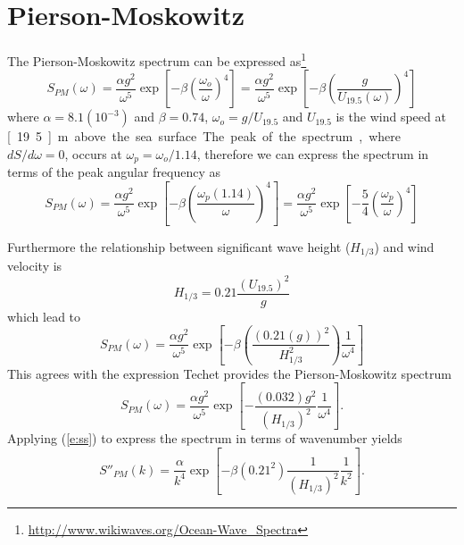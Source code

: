 \documentclass[11pt]{article}
\begin{document}
\section{Pierson-Moskowitz}
The Pierson-Moskowitz spectrum can be expressed as\footnote{\url{http://www.wikiwaves.org/Ocean-Wave_Spectra}}
\begin{equation}
S_{PM}(\omega)=\frac{\alpha g^2}{\omega^5} \exp{\left[ -\beta \left(\frac{\omega_o}{\omega}\right)^4 \right]} =\frac{\alpha g^2}{\omega^5} \exp{\left[ -\beta \left(\frac{g}{U_{19.5}(\omega)}\right)^4 \right]}
\end{equation}
where $\alpha=8.1(10^{-3})$ and $\beta=0.74$, $\omega_o = g/U_{19.5}$ and $U_{19.5}$ is the wind speed at \unit[19.5]{m} above the sea surface.

The peak of the spectrum, where $dS/d\omega=0$, occurs at $\omega_p=\omega_o/1.14$, therefore we can express the spectrum in terms of the peak angular frequency as
\begin{equation}
  S_{PM}(\omega)=\frac{\alpha g^2}{\omega^5} \exp{\left[ -\beta \left(\frac{\omega_p (1.14)}{\omega}\right)^4 \right]} =\frac{\alpha g^2}{\omega^5} \exp{\left[ -\frac{5}{4} \left(\frac{\omega_p}{\omega}\right)^4 \right]}
  \end{equation}

Furthermore the relationship between significant wave height ($H_{1/3}$) and wind velocity is
\begin{equation}
H_{1/3} = 0.21 \frac{\left(U_{19.5}\right)^2}{g}
\label{e:pmh}
\end{equation}
which lead to 
\begin{equation}
S_{PM}(\omega)=\frac{\alpha g^2}{\omega^5} \exp{\left[ -\beta \left(\frac{(0.21(g))^2}{H_{1/3}^2}\right) \frac{1}{\omega^4} \right]}
\label{e:pmh3}
\end{equation}
This agrees with the expression Techet provides the Pierson-Moskowitz spectrum 
\begin{equation}
S_{PM}(\omega)=\frac{\alpha g^2}{\omega^5} \exp{\left[ - \frac{(0.032)g^2}{\left(H_{1/3}\right)^2} \frac{1}{\omega^4} \right]}.
\label{e:pmh4}
\end{equation} 
Applying (\ref{e:ss}) to express the spectrum in terms of wavenumber yields
\begin{equation}
S''_{PM}(k) = \frac{\alpha}{k^4} \exp{\left[ -\beta (0.21^2) \frac{1}{(H_{1/3})^2}\frac{1}{k^2} \right]}.
\label{e:pmk}
\end{equation}
\end{document}
